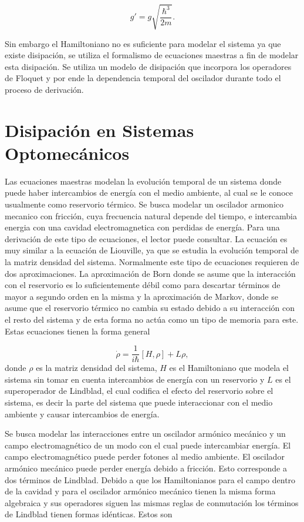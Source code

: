 \documentclass[10pt,a4paper]{report}
\begin{document}
\begin{equation}
g'=g\sqrt{\frac{\hbar^3}{2m}}.
\end{equation}

Sin embargo el Hamiltoniano no es suficiente para modelar el sistema ya que existe disipación, se utiliza el formalismo de ecuaciones maestras a fin de modelar esta disipación. Se utiliza un modelo de disipación que incorpora los operadores de Floquet y por ende la dependencia temporal del oscilador durante todo el proceso de derivación. 

\section{Disipación en Sistemas Optomecánicos}\label{Disipacion}

Las ecuaciones maestras modelan la evolución temporal de un sistema donde puede haber intercambios de energía con el medio ambiente, al cual se le conoce usualmente como reservorio térmico. Se busca modelar un oscilador armonico
mecanico con fricción, cuya frecuencia natural depende del tiempo, e
intercambia energia con una cavidad electromagnetica con perdidas de energía. Para una derivación de este tipo de ecuaciones, el lector puede consultar\cite{ZollerQN}. La ecuación es muy similar a la ecuación de Liouville, ya que se estudia la evolución temporal de la matriz densidad del sistema. Normalmente este tipo de ecuaciones requieren de dos aproximaciones. La aproximación de Born donde se asume que la interacción con el reservorio es lo suficientemente débil como para descartar términos de mayor a segundo orden en la misma y la aproximación de Markov, donde se asume que el reservorio térmico no cambia su estado debido a su interacción con el resto del sistema y de esta forma no actúa como un tipo de memoria para este\cite{CarmichaelFL}. Estas ecuaciones tienen la forma general

\begin{equation}\label{MasterEq}
\dot{\rho} = \frac{1}{i\hbar}[H,\rho] + L\rho,
\end{equation} donde $\rho$ es la matriz densidad del sistema, $H$ es el Hamiltoniano que modela el sistema sin tomar en cuenta intercambios de energía con un reservorio y $L$ es el superoperador de Lindblad, el cual codifica el efecto del reservorio sobre el sistema, es decir la parte del sistema que puede interaccionar con el medio ambiente y causar intercambios de energía.

Se busca modelar las interacciones entre un oscilador armónico mecánico y un campo electromagnético de un modo con el cual puede intercambiar energía. El campo electromagnético puede perder fotones al medio ambiente. El oscilador armónico mecánico puede perder energía debido a fricción. Esto corresponde a dos términos de Lindblad. Debido a que los Hamiltonianos para el campo dentro de la cavidad y para el oscilador armónico mecánico tienen la misma forma algebraica y sus operadores siguen las mismas reglas de conmutación los términos de Lindblad tienen formas idénticas. Estos son \cite{EnglertDB}
\end{document}
